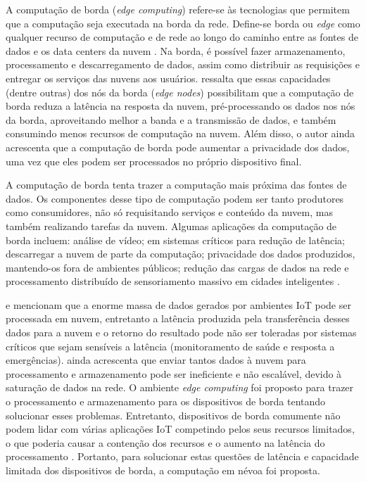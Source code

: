 
A computação de borda (\emph{edge computing}) refere-se às
tecnologias que permitem que a computação seja executada na borda da rede.
Define-se borda ou \emph{edge} como qualquer recurso de computação e de rede ao
longo do caminho entre as fontes de dados e os data centers da nuvem
\cite{Shi2016}.
Na borda, é possível fazer armazenamento, processamento e descarregamento de
dados, assim como distribuir as requisições e entregar os serviços das nuvens
aos usuários.
 ressalta que essas capacidades (dentre outras) dos nós da
borda (\emph{edge nodes}) possibilitam que a computação de borda reduza a
latência na resposta da nuvem, pré-processando os dados nos nós da borda,
aproveitando melhor a banda e a transmissão de dados, e também consumindo menos
recursos de computação na nuvem.
Além disso, o autor ainda acrescenta que a computação de borda pode aumentar a
privacidade dos dados, uma vez que eles podem ser processados no próprio
dispositivo final.

A computação de borda tenta trazer a computação mais próxima das fontes de
dados.
Os componentes desse tipo de computação podem ser
tanto produtores como consumidores, não só requisitando serviços e conteúdo da
nuvem, mas também realizando tarefas da nuvem.
Algumas aplicações da computação de borda incluem: análise de vídeo;
em sistemas críticos para redução de latência;
descarregar a nuvem de parte da computação;
privacidade dos dados produzidos, mantendo-os fora de ambientes públicos;
redução das cargas de dados na rede e
processamento distribuído de sensoriamento massivo em cidades inteligentes \cite{Shi2016}.


 e 
mencionam que a enorme massa de dados gerados por ambientes IoT pode ser
processada em nuvem, entretanto a latência produzida pela transferência desses
dados para a nuvem e o retorno do resultado pode não ser toleradas por sistemas
críticos que sejam sensíveis a latência (monitoramento de saúde e resposta a
emergências).
 ainda acrescenta que enviar tantos
dados à nuvem
para processamento e armazenamento pode ser ineficiente e não escalável, devido à
saturação de dados na rede.
O ambiente \emph{edge computing} foi proposto para trazer o
processamento e armazenamento para os dispositivos de borda tentando solucionar
esses problemas.
Entretanto, dispositivos de borda comumente não podem lidar com várias
aplicações IoT competindo pelos seus recursos limitados, o que poderia causar a
contenção dos recursos e o aumento na latência do processamento
\cite{Dastjerdi2016}. Portanto, para solucionar estas questões de latência e
capacidade limitada dos dispositivos de borda, a computação em névoa foi proposta.

